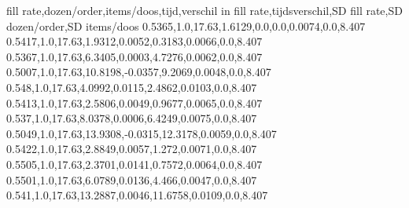 fill rate,dozen/order,items/doos,tijd,verschil in fill rate,tijdsverschil,SD fill rate,SD dozen/order,SD items/doos
0.5365,1.0,17.63,1.6129,0.0,0.0,0.0074,0.0,8.407
0.5417,1.0,17.63,1.9312,0.0052,0.3183,0.0066,0.0,8.407
0.5367,1.0,17.63,6.3405,0.0003,4.7276,0.0062,0.0,8.407
0.5007,1.0,17.63,10.8198,-0.0357,9.2069,0.0048,0.0,8.407
0.548,1.0,17.63,4.0992,0.0115,2.4862,0.0103,0.0,8.407
0.5413,1.0,17.63,2.5806,0.0049,0.9677,0.0065,0.0,8.407
0.537,1.0,17.63,8.0378,0.0006,6.4249,0.0075,0.0,8.407
0.5049,1.0,17.63,13.9308,-0.0315,12.3178,0.0059,0.0,8.407
0.5422,1.0,17.63,2.8849,0.0057,1.272,0.0071,0.0,8.407
0.5505,1.0,17.63,2.3701,0.0141,0.7572,0.0064,0.0,8.407
0.5501,1.0,17.63,6.0789,0.0136,4.466,0.0047,0.0,8.407
0.541,1.0,17.63,13.2887,0.0046,11.6758,0.0109,0.0,8.407
